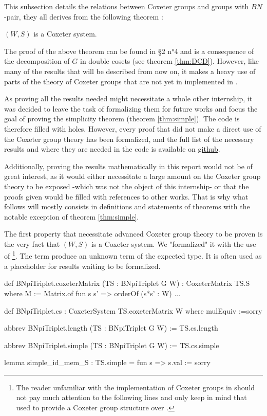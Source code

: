 This subsection details the relations between Coxeter groups and groups with $BN$-pair, they all derives from the following theorem :
\begin{theoreme} \label{thm:Coxeter}
    $\left( W,S \right)$ is a Coxeter system.
\end{theoreme}
 The proof of the above theorem can be found in \cite{bourbaki_groupes_2007} §2 n°4 and is a consequence of the decomposition of $G$ in double cosets (see theorem \ref{thm:DCD}). However, like many of the results that will be described from now on, it makes a heavy use of parts of the theory of Coxeter groups that are not yet in implemented in \Lean.
    
 As proving all the results needed might necessitate a whole other internship, it was decided to leave the task of formalizing them for future works and focus the goal of proving the simplicity theorem (theorem \ref{thm:simple}). The \Lean code is therefore filled with holes. However, every proof that did not make a direct use of the Coxeter group theory has been formalized, and the full list of the necessary results and where they are needed in the code is available on \href{https://github.com/corent1234/BNpairs}{github}.

 Additionally, proving the results mathematically in this report would not be of great interest, as it would either necessitate a large amount on the Coxeter group theory to be exposed -which was not the object of this internship- or that the proofs given would be filled with references to other works. That is why what follows will mostly consists in definitions and statements of theorems with the notable exception of theorem \ref{thm:simple}.

The first property that necessitate advanced Coxeter group theory to be proven is the very fact that $\left( W,S \right)$ is a Coxeter system. We "formalized" it with the use of  \footnote{The reader unfamiliar with the implementation of Coxeter groups in \Lean should not pay much attention to the following lines and only keep in mind that used  to provide a Coxeter group structure over .}. The term  produce an unknown term of the expected type. It is often used as a placeholder for results waiting to be formalized.

\begin{leancode}
def BNpiTriplet.coxeterMatrix  (TS : BNpiTriplet G W) : CoxeterMatrix TS.S where
  M := Matrix.of fun s s' => orderOf (s*s' : W)
  ...

def  BNpiTriplet.cs : CoxeterSystem TS.coxeterMatrix W where
  mulEquiv :=sorry

abbrev BNpiTriplet.length (TS : BNpiTriplet G W) := TS.cs.length

abbrev BNpiTriplet.simple (TS : BNpiTriplet G W) := TS.cs.simple

lemma simple_id_mem_S : TS.simple = fun s => s.val := sorry
\end{leancode}

